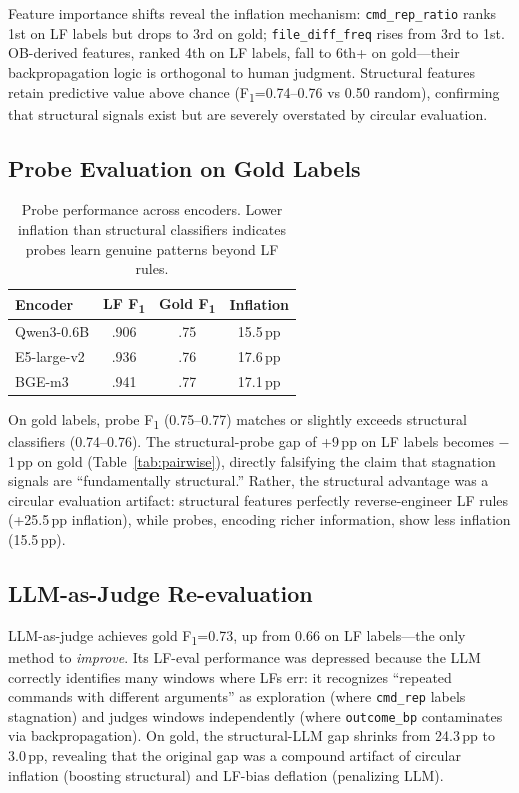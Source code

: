 \documentclass[11pt,a4paper]{article}
\newcommand{\fone}{F\textsubscript{1}}
\newcommand{\pp}{\,pp}
\begin{document}
Feature importance shifts reveal the inflation mechanism: \texttt{cmd\_rep\_ratio} ranks 1st on LF labels but drops to 3rd on gold; \texttt{file\_diff\_freq} rises from 3rd to 1st.
OB-derived features, ranked 4th on LF labels, fall to 6th+ on gold---their backpropagation logic is orthogonal to human judgment.
Structural features retain predictive value above chance (\fone{}=0.74--0.76 vs 0.50 random), confirming that structural signals exist but are severely overstated by circular evaluation.

\subsection{Probe Evaluation on Gold Labels}
\label{sec:probe-gold}

\begin{table}[t]
\centering
\small
\begin{tabular}{lccc}
\toprule
\textbf{Encoder} & \textbf{LF \fone} & \textbf{Gold \fone} & \textbf{Inflation} \\
\midrule
Qwen3-0.6B & .906 & .75 & 15.5\pp \\
E5-large-v2 & .936 & .76 & 17.6\pp \\
BGE-m3 & .941 & .77 & 17.1\pp \\
\bottomrule
\end{tabular}
\caption{Probe performance across encoders. Lower inflation than structural classifiers indicates probes learn genuine patterns beyond LF rules.}
\label{tab:probe-gold}
\end{table}

On gold labels, probe \fone{} (0.75--0.77) matches or slightly exceeds structural classifiers (0.74--0.76).
The structural-probe gap of +9\pp{} on LF labels becomes $-$1\pp{} on gold (Table~\ref{tab:pairwise}), directly falsifying the claim that stagnation signals are ``fundamentally structural.''
Rather, the structural advantage was a circular evaluation artifact: structural features perfectly reverse-engineer LF rules (+25.5\pp{} inflation), while probes, encoding richer information, show less inflation (15.5\pp).

\subsection{LLM-as-Judge Re-evaluation}
\label{sec:llm-gold}

LLM-as-judge achieves gold \fone{}=0.73, up from 0.66 on LF labels---the only method to \emph{improve}.
Its LF-eval performance was depressed because the LLM correctly identifies many windows where LFs err: it recognizes ``repeated commands with different arguments'' as exploration (where \texttt{cmd\_rep} labels stagnation) and judges windows independently (where \texttt{outcome\_bp} contaminates via backpropagation).
On gold, the structural-LLM gap shrinks from 24.3\pp{} to 3.0\pp{}, revealing that the original gap was a compound artifact of circular inflation (boosting structural) and LF-bias deflation (penalizing LLM).
\end{document}
